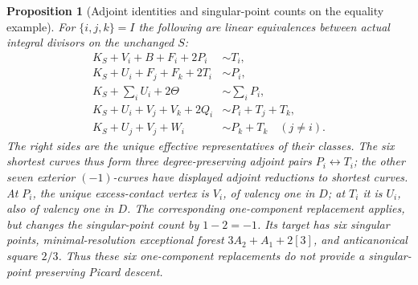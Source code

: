 \documentclass[11pt,reqno]{amsart}
\newtheorem{proposition}[proposition]{Proposition}
\theoremstyle{definition}
\theoremstyle{remark}
\numberwithin{equation}{section}
\begin{document}
\begin{proposition}[Adjoint identities and singular-point counts on the equality example]
\label{prop:equality-adjoints}
For $\{i,j,k\}=I$ the following are linear equivalences between actual
integral divisors on the unchanged $S$:
\[
\begin{aligned}
 K_S+V_i+B+F_i+2P_i&\sim T_i,\\
 K_S+U_i+F_j+F_k+2T_i&\sim P_i,\\
 K_S+\sum_iU_i+2\Theta&\sim\sum_iP_i,\\
 K_S+U_i+V_j+V_k+2Q_i&\sim P_i+T_j+T_k,\\
 K_S+U_j+V_j+W_i&\sim P_k+T_k\quad(j\ne i).
\end{aligned}
\]
The right sides are the unique effective representatives of their
classes. The six shortest curves thus form three degree-preserving
adjoint pairs $P_i\leftrightarrow T_i$; the other seven exterior
$(-1)$-curves have displayed adjoint reductions to shortest curves.
At $P_i$, the unique excess-contact vertex is $V_i$, of valency one in $D$;
at $T_i$ it is $U_i$, also of valency one in $D$.
The corresponding one-component replacement applies, but changes
the singular-point count by $1-2=-1$. Its target has six singular points,
minimal-resolution exceptional forest $3A_2+A_1+2[3]$, and anticanonical square $2/3$.
Thus these six one-component replacements do not provide a singular-point preserving
Picard descent.
\end{proposition}
\end{document}
